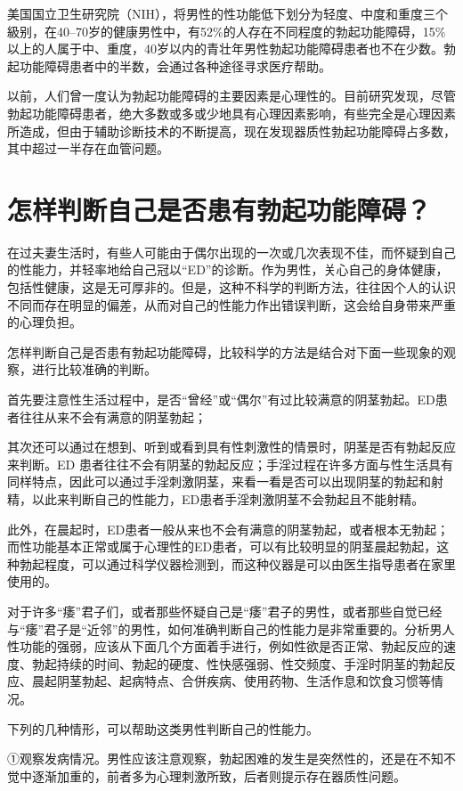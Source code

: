 \documentclass[12pt,UTF8]{ctexbook}
\begin{document}
美国国立卫生研究院（NIH），将男性的性功能低下划分为轻度、中度和重度三个級别，在40--70岁的健康男性中，有52\%的人存在不同程度的勃起功能障碍，15\%以上的人属于中、重度，40岁以内的青壮年男性勃起功能障碍患者也不在少数。勃起功能障碍患者中的半数，会通过各种途径寻求医疗帮助。

以前，人们曾一度认为勃起功能障碍的主要因素是心理性的。目前研究发现，尽管勃起功能障碍患者，绝大多数或多或少地具有心理因素影响，有些完全是心理因素所造成，但由于辅助诊断技术的不断提高，现在发现器质性勃起功能障碍占多数，其中超过一半存在血管问题。

\section{怎样判断自己是否患有勃起功能障碍？}

在过夫妻生活时，有些人可能由于偶尔出现的一次或几次表现不佳，而怀疑到自己的性能力，并轻率地给自己冠以“ED”的诊断。作为男性，关心自己的身体健康，包括性健康，这是无可厚非的。但是，这种不科学的判断方法，往往因个人的认识不同而存在明显的偏差，从而对自己的性能力作出错误判断，这会给自身带来严重的心理负担。

怎样判断自己是否患有勃起功能障碍，比较科学的方法是结合对下面一些现象的观察，进行比较准确的判断。

首先要注意性生活过程中，是否“曾经”或“偶尔”有过比较满意的阴茎勃起。ED患者往往从来不会有满意的阴茎勃起；

其次还可以通过在想到、听到或看到具有性刺激性的情景时，阴茎是否有勃起反应来判断。ED 患者往往不会有阴茎的勃起反应；手淫过程在许多方面与性生活具有同样特点，因此可以通过手淫刺激阴茎，来看一看是否可以出现阴茎的勃起和射精，以此来判断自己的性能力，ED患者手淫刺激阴茎不会勃起且不能射精。

此外，在晨起时，ED患者一般从来也不会有满意的阴茎勃起，或者根本无勃起；而性功能基本正常或属于心理性的ED患者，可以有比较明显的阴茎晨起勃起，这种勃起程度，可以通过科学仪器检测到，而这种仪器是可以由医生指导患者在家里使用的。

对于许多“痿”君子们，或者那些怀疑自己是“痿”君子的男性，或者那些自觉已经与“痿”君子是“近邻”的男性，如何准确判断自己的性能力是非常重要的。分析男人性功能的强弱，应该从下面几个方面着手进行，例如性欲是否正常、勃起反应的速度、勃起持续的时间、勃起的硬度、性快感强弱、性交频度、手淫时阴茎的勃起反应、晨起阴茎勃起、起病特点、合併疾病、使用药物、生活作息和饮食习惯等情况。

下列的几种情形，可以帮助这类男性判断自己的性能力。

①观察发病情况。男性应该注意观察，勃起困难的发生是突然性的，还是在不知不觉中逐渐加重的，前者多为心理刺激所致，后者则提示存在器质性问题。
\end{document}
